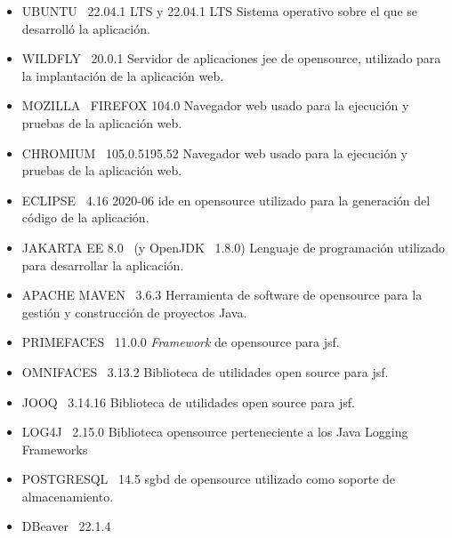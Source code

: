 \begin{itemize}
 \item UBUNTU~\cite{Ubuntu} 22.04.1 LTS y 22.04.1 LTS\newline
 Sistema operativo sobre el que se desarrolló la aplicación.
 \item WILDFLY~ \cite{Wildfly} 20.0.1\newline
 Servidor de aplicaciones \acrshort{jee} de \gls{opensource}, utilizado para la implantación de la aplicación web.
 \item MOZILLA~\cite{Mozilla} FIREFOX 104.0\newline
 Navegador web usado para la ejecución y pruebas de la aplicación web.
  \item CHROMIUM~\cite{Chromium} 105.0.5195.52\newline
 Navegador web usado para la ejecución y pruebas de la aplicación web.
 \item ECLIPSE~\cite{EclipseIDE} 4.16 2020-06\newline
 \acrfull{ide} en \gls{opensource} utilizado para la generación del código de la aplicación.
 \item JAKARTA EE 8.0~\cite{JakartaEE} (y OpenJDK~\cite{OpenJDK} 1.8.0)\newline
 Lenguaje de programación utilizado para desarrollar la aplicación.
 \item APACHE MAVEN~\cite{ApacheMaven} 3.6.3\newline
 Herramienta de software de \gls{opensource} para la gestión y construcción de proyectos Java.
 \item PRIMEFACES~\cite{Primefaces} 11.0.0\newline
 \emph{Framework} de \gls{opensource} para \acrshort{jsf}.
 \item OMNIFACES~\cite{Omnifaces} 3.13.2\newline
 Biblioteca de utilidades open source para \acrshort{jsf}. 
 \item JOOQ~\cite{JooQ} 3.14.16\newline
 Biblioteca de utilidades open source para \acrshort{jsf}.  
 \item LOG4J~\cite{Log4j} 2.15.0\newline
 Biblioteca \gls{opensource} perteneciente a los Java Logging Frameworks 
 \item POSTGRESQL~\citep{Postgresql} 14.5\newline
 \acrshort{sgbd} de \gls{opensource} utilizado como soporte de almacenamiento.
 \item DBeaver~\cite{DBeaver} 22.1.4\newline

\end{itemize}
